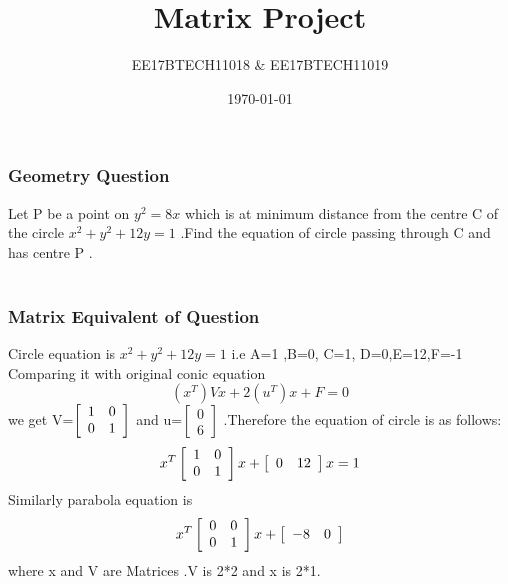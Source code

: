 \documentclass{beamer}
\title[Short title]{Matrix Project } %
\author{EE17BTECH11018 \& EE17BTECH11019} %
\institute[IIT Hyderabad] %
{
IIT Hyderabad \\ %
\medskip
\textit{EE 1390-INTRO to AI and ML} 
}
\date{\today} %
\begin{document}
\begin{frame}
\titlepage %
\end{frame}




\begin{frame}
\frametitle{Geometry Question}
Let P be a point on $ y^2=8x $ which is at minimum distance from the centre C of the circle $x^2+y^2+12y=1$ .Find the equation of circle passing through C and has centre P  .\\~\\


\end{frame}


\begin{frame}
\frametitle{Matrix Equivalent of Question}
Circle equation is  $x^2+y^2+12y=1$ i.e A=1 ,B=0, C=1, D=0,E=12,F=-1
Comparing it with original conic equation $$(x^T)Vx+2(u^T)x+F=0$$
we get V=$ \left[ 
  \begin{array}{ c c }
     1& 0\\
     0 & 1
  \end{array} \right]$ and u=$ \left[
  \begin{array}{ c }
     0 \\
     6
  \end{array} \right]$
 .Therefore  the equation of circle is as follows:
\[
x^T \left[
  \begin{array}{ c c }
     1 & 0 \\
     0& 1
  \end{array} \right]
x+ \left[
  \begin{array}{ c c }
     0 & 12 \\
     
  \end{array} \right]
x=1
\]
Similarly parabola equation is 
\[ x^T \left[
  \begin{array}{ c c }
     0 & 0\\
     0 & 1
  \end{array} \right]
x+ \left[
  \begin{array}{ c c }
     -8&0 \\
    
  \end{array} \right]
\]
where x and V are Matrices .V is 2*2 and x is 2*1.

\end{frame}
\end{document}
